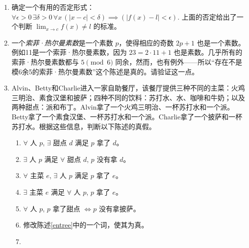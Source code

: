 \begin{enumerate}
{    }
    
    \wbvfill
    
    \workbookpagebreak
    
    \item 
    确定一个有用的否定形式：
    $\displaystyle \forall \epsilon>0 \, \exists 
    \delta>0 \, \forall x \, (|x-c| < \delta) \implies (|f(x)-l| < \epsilon) $.
    上面的否定给出了一个判断 $\lim_{x\rightarrow c}f(x) \neq l$ 的标准。
    
    
    \wbvfill
    
    \item 
    
    一个\emph{索菲·热尔曼素数}是一个素数 $p$，使得相应的奇数 $2p+1$ 也是一个素数。例如11是一个索菲·热尔曼素数，因为 $23 = 2\cdot 11 + 1$ 也是素数。几乎所有的索菲·热尔曼素数都与 $5 \pmod{6}$ 同余，然而，也有例外——所以“存在不是模6余5的索菲·热尔曼素数”这个陈述是真的。请验证这一点。
    
    
    \wbvfill
    
    \workbookpagebreak
    
    \item  
    
    Alvin、Betty和Charlie进入一家自助餐厅，该餐厅提供三种不同的主菜：火鸡三明治、素食汉堡和披萨；四种不同的饮料：苏打水、水、咖啡和牛奶；以及两种甜点：派和布丁。Alvin拿了一个火鸡三明治、一杯苏打水和一个派。Betty拿了一个素食汉堡、一杯苏打水和一个派。Charlie拿了一个披萨和一杯苏打水。根据这些信息，判断以下陈述的真假。
    \begin{enumerate}
    \item \label{negated} \wbitemsep 
    
    $\forall$ 人 $p$, $\exists$ 甜点 $d$ 满足 $p$ 拿了 $d$。
    \item \label{compare} \wbitemsep 
    $\exists$ 人 $p$ 满足 $\forall$ 甜点 $d$, $p$ 没有拿 $d$。
    \item \wbitemsep 
    $\forall$ 主菜 $e$, $\exists$ 人 $p$ 满足 $p$ 拿了 $e$。
    \item \label{entree} \wbitemsep 
    $\exists$ 主菜 $e$ 满足 $\forall$ 人 $p$, $p$ 拿了 $e$。
    \item \wbitemsep 
    $\forall$ 人 $p$, $p$ 拿了甜点 $\iff p$ 没有拿披萨。
    \item \wbitemsep 
    修改陈述\ref{entree}中的一个词，使其为真。
    \item \wbitemsep 
    

\end{enumerate}
\end{enumerate}
